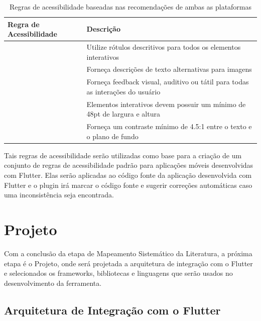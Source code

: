 \begin{table}[!htbp]
	\centering
	\renewcommand{\arraystretch}{1.1}
	\caption{Regras de acessibilidade baseadas nas recomendações de ambas as plataformas}
	\label{tab:regras-acessibilidade}
	\begin{tabular}{ R{4cm}  L{10cm} }
		\hline
		Regra de Acessibilidade & Descrição \\
		\hline
		\thera\label{ra:tooltip} & Utilize rótulos descritivos para todos os elementos interativos \\
		\thera\label{ra:descricao-imagens} & Forneça descrições de texto alternativas para imagens \\
		\thera\label{ra:feedback-visual} & Forneça feedback visual, auditivo ou tátil para todas as interações do usuário \\
		\thera\label{ra:largura-minima} & Elementos interativos devem possuir um mínimo de 48pt de largura e altura \\
		\thera\label{ra:contraste-minimo} & Forneça um contraste mínimo de 4.5:1 entre o texto e o plano de fundo \\
		\hline
	\end{tabular}
	\vspace{2mm}
\end{table}

Tais regras de acessibilidade serão utilizadas como base para a criação de um conjunto de regras de acessibilidade padrão para aplicações móveis desenvolvidas com Flutter. Elas serão aplicadas ao código fonte da aplicação desenvolvida com Flutter e o plugin irá marcar o código fonte e sugerir correções automáticas caso uma inconsistência seja encontrada.

\section{Projeto}

Com a conclusão da etapa de Mapeamento Sistemático da Literatura, a próxima etapa é o Projeto, onde será projetada a arquitetura de integração com o Flutter e selecionados os frameworks, bibliotecas e linguagens que serão usados no desenvolvimento da ferramenta.

\subsection{Arquitetura de Integração com o Flutter}

